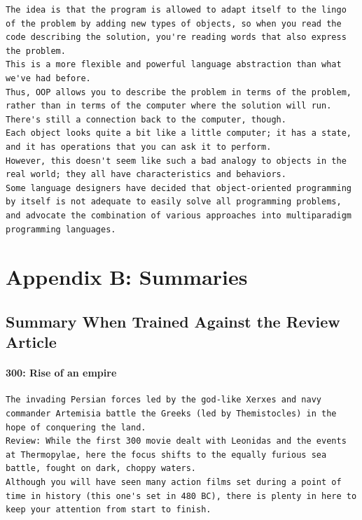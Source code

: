 \documentclass[BTech]{nitgoathesis}
\begin{document}
\begin{lstlisting}[basicstyle=\scriptsize]
The idea is that the program is allowed to adapt itself to the lingo of the problem by adding new types of objects, so when you read the code describing the solution, you're reading words that also express the problem.
This is a more flexible and powerful language abstraction than what we've had before.
Thus, OOP allows you to describe the problem in terms of the problem, rather than in terms of the computer where the solution will run. 
There's still a connection back to the computer, though.
Each object looks quite a bit like a little computer; it has a state, and it has operations that you can ask it to perform.
However, this doesn't seem like such a bad analogy to objects in the real world; they all have characteristics and behaviors.
Some language designers have decided that object-oriented programming by itself is not adequate to easily solve all programming problems, and advocate the combination of various approaches into multiparadigm programming languages.
\end{lstlisting}

\chapter{Appendix B: Summaries}
\section{Summary When Trained Against the Review Article}
\subsubsection{300: Rise of an empire}
\begin{lstlisting}[basicstyle=\scriptsize]
The invading Persian forces led by the god-like Xerxes and navy commander Artemisia battle the Greeks (led by Themistocles) in the hope of conquering the land.
Review: While the first 300 movie dealt with Leonidas and the events at Thermopylae, here the focus shifts to the equally furious sea battle, fought on dark, choppy waters.
Although you will have seen many action films set during a point of time in history (this one's set in 480 BC), there is plenty in here to keep your attention from start to finish.
\end{lstlisting}
\end{document}
